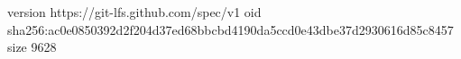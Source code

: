 version https://git-lfs.github.com/spec/v1
oid sha256:ac0e0850392d2f204d37ed68bbcbd4190da5ccd0e43dbe37d2930616d85c8457
size 9628
